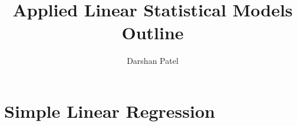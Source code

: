 \documentclass[11pt]{report}
\begin{document}
\title{Applied Linear Statistical Models \\ Outline}
\author{Darshan Patel}
\maketitle
\tableofcontents

\chapter{Simple Linear Regression} 

 
\end{document}
